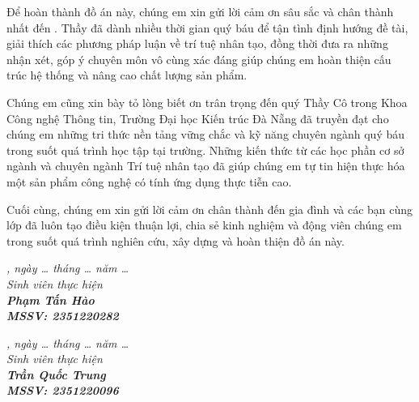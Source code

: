 \begin{acknowledgments}

Để hoàn thành đồ án này, chúng em xin gửi lời cảm ơn sâu sắc và chân thành nhất đến \dauGVHD. Thầy đã dành nhiều thời gian quý báu để tận tình định hướng đề tài, giải thích các phương pháp luận về trí tuệ nhân tạo, đồng thời đưa ra những nhận xét, góp ý chuyên môn vô cùng xác đáng giúp chúng em hoàn thiện cấu trúc hệ thống và nâng cao chất lượng sản phẩm.

Chúng em cũng xin bày tỏ lòng biết ơn trân trọng đến quý Thầy Cô trong Khoa Công nghệ Thông tin, Trường Đại học Kiến trúc Đà Nẵng đã truyền đạt cho chúng em những tri thức nền tảng vững chắc và kỹ năng chuyên ngành quý báu trong suốt quá trình học tập tại trường. Những kiến thức từ các học phần cơ sở ngành và chuyên ngành Trí tuệ nhân tạo đã giúp chúng em tự tin hiện thực hóa một sản phẩm công nghệ có tính ứng dụng thực tiễn cao.

Cuối cùng, chúng em xin gửi lời cảm ơn chân thành đến gia đình và các bạn cùng lớp đã luôn tạo điều kiện thuận lợi, chia sẻ kinh nghiệm và động viên chúng em trong suốt quá trình nghiên cứu, xây dựng và hoàn thiện đồ án này.

\vspace{1.4em}
\noindent\begin{minipage}[t]{0.48\textwidth}
\centering\itshape \dauNoi, ngày \dots{} tháng \dots{} năm \dots\\[2pt]
Sinh viên thực hiện\\[1.8cm]
\upshape\bfseries Phạm Tấn Hào\\[2pt]
\footnotesize\normalfont MSSV: 2351220282
\end{minipage}\hfill
\begin{minipage}[t]{0.48\textwidth}
\centering\itshape \dauNoi, ngày \dots{} tháng \dots{} năm \dots\\[2pt]
Sinh viên thực hiện\\[1.8cm]
\upshape\bfseries Trần Quốc Trung\\[2pt]
\footnotesize\normalfont MSSV: 2351220096
\end{minipage}

\end{acknowledgments}

